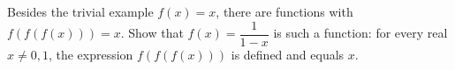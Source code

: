 Besides the trivial example $f(x)=x$, there are functions with $f(f(f(x)))=x$. Show that $f(x)=\dfrac{1}{1-x}$ is such a function: for every real $x\ne0,1$, the expression $f(f(f(x)))$ is defined and equals $x$.
